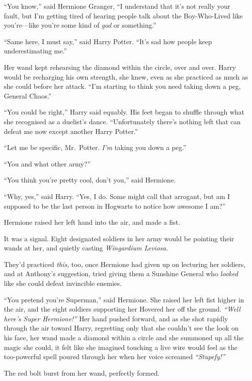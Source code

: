 ``You know,'' said Hermione Granger, ``I understand that it's not really
your fault, but I'm getting tired of hearing people talk about the
Boy-Who-Lived like you're---like you're some kind of \emph{god} or
something.''

``Same here, I must say,'' said Harry Potter. ``It's sad how people keep
underestimating me.''

Her wand kept rehearsing the diamond within the circle, over and over.
Harry would be recharging his own strength, she knew, even as she
practiced as much as she could before her attack. ``I'm starting to
think you need taking down a peg, General Chaos.''

``You could be right,'' Harry said equably. His feet began to shuffle
through what she recognised as a duelist's dance. ``Unfortunately
there's nothing left that can defeat me now except another Harry
Potter.''

``Let me be specific, Mr.~Potter. \emph{I'm} taking you down a peg.''

``You and what other army?''

``You think you're pretty cool, don't you,'' said Hermione.

``Why, yes,'' said Harry. ``Yes, I do. Some might call that arrogant,
but am I supposed to be the last person in Hogwarts to notice how
awesome I am?''

Hermione raised her left hand into the air, and made a fist.

It was a signal. Eight designated soldiers in her army would be pointing
their wands at her, and quietly casting \emph{Wingardium Leviosa}.

They'd practiced \emph{this,} too, once Hermione had given up on
lecturing her soldiers, and at Anthony's suggestion, tried giving them a
Sunshine General who \emph{looked} like she could defeat invincible
enemies.

``You pretend you're Superman,'' said Hermione. She raised her left fist
higher in the air, and the eight soldiers supporting her Hovered her off
the ground. \emph{``Well here's Super Hermione!''} Her hand pushed
forward, and as she shot rapidly through the air toward Harry,
regretting only that she couldn't see the look on his face, her wand
made a diamond within a circle and she summoned up all the magic she
could, it felt like she imagined touching a live wire would feel as the
too-powerful spell poured through her when her voice screamed
\emph{``Stupefy!''}

The red bolt burst from her wand, perfectly formed.

